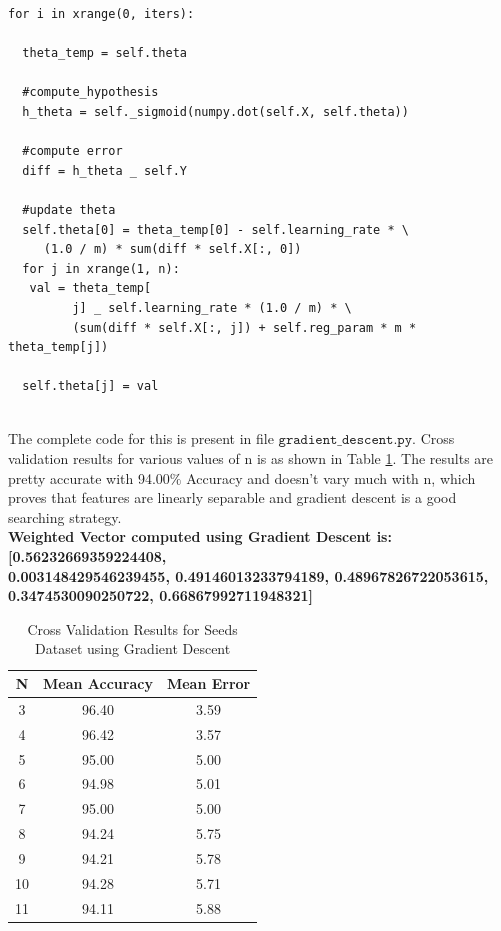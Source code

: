\documentclass[11pt, pdftex]{article}
\begin{document}
\begin{lstlisting}
for i in xrange(0, iters):

  theta_temp = self.theta
  
  #compute_hypothesis
  h_theta = self._sigmoid(numpy.dot(self.X, self.theta))
  
  #compute error
  diff = h_theta _ self.Y
  
  #update theta
  self.theta[0] = theta_temp[0] - self.learning_rate * \
     (1.0 / m) * sum(diff * self.X[:, 0])
  for j in xrange(1, n):
   val = theta_temp[
         j] _ self.learning_rate * (1.0 / m) * \
         (sum(diff * self.X[:, j]) + self.reg_param * m * theta_temp[j])
         
  self.theta[j] = val
\end{lstlisting}
\\
The complete code for this is present in file $\texttt{gradient\_descent.py}$. Cross validation results for various values of n is as shown in Table \ref{tab:gradcv}. The results are pretty accurate with 94.00$\%$ Accuracy and doesn't vary much with n, which proves that features are linearly separable and gradient descent is a good searching strategy.\\
{\bf Weighted Vector computed using Gradient Descent is: [0.56232669359224408, \\
0.003148429546239455, 
0.49146013233794189, 0.48967826722053615, 0.3474530090250722, 0.66867992711948321]}
\begin{table}
\centering
\begin{tabular}{ | c | c | c |}
    \hline
    {\bf N} & {\bf Mean Accuracy} & {\bf Mean Error}\\ 
    \hline
    3 & 96.40 & 3.59\\
	\hline
	4 & 96.42 & 3.57\\
	\hline
	5 & 95.00 & 5.00\\
	\hline
	6 & 94.98 & 5.01\\
	\hline
	7 & 95.00 & 5.00\\
	\hline
	8 & 94.24 & 5.75\\
	\hline
	9 & 94.21 & 5.78\\
	\hline
	10 & 94.28 & 5.71\\
	\hline
	11 & 94.11 & 5.88\\
	\hline
	\end{tabular}
	\caption{Cross Validation Results for Seeds Dataset using Gradient Descent}
    \label{tab:gradcv}
\end{table}
\end{document}
